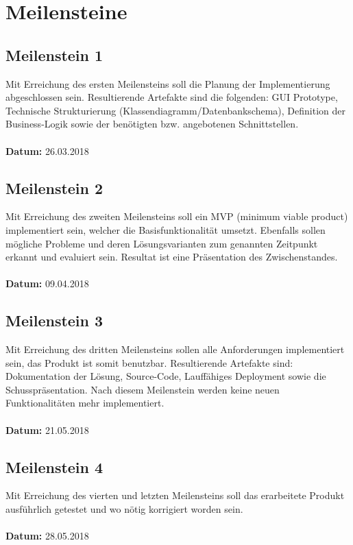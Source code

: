 \chapter{Meilensteine}
\vspace{0.5cm}

\section{Meilenstein 1}
Mit Erreichung des ersten Meilensteins soll die Planung der Implementierung abgeschlossen sein. Resultierende Artefakte sind die folgenden: GUI Prototype, Technische Strukturierung (Klassendiagramm/Datenbankschema), Definition der Business-Logik sowie der benötigten bzw. angebotenen Schnittstellen.\\ \\
\textbf{Datum:} 26.03.2018

\section{Meilenstein 2}
Mit Erreichung des zweiten Meilensteins soll ein MVP (minimum viable product) implementiert sein, welcher die Basisfunktionalität umsetzt. Ebenfalls sollen mögliche Probleme und deren Lösungsvarianten zum genannten Zeitpunkt erkannt und evaluiert sein. Resultat ist eine Präsentation des Zwischenstandes. \\ \\
\textbf{Datum:} 09.04.2018

\section{Meilenstein 3}
Mit Erreichung des dritten Meilensteins sollen alle Anforderungen implementiert sein, das Produkt ist somit benutzbar. Resultierende Artefakte sind: Dokumentation der Lösung, Source-Code, Lauffähiges Deployment sowie die Schusspräsentation. Nach diesem Meilenstein werden keine neuen Funktionalitäten mehr implementiert.\\ \\
\textbf{Datum:} 21.05.2018

\section{Meilenstein 4}
Mit Erreichung des vierten und letzten Meilensteins soll das erarbeitete Produkt ausführlich getestet und wo nötig korrigiert worden sein.\\ \\
\textbf{Datum:} 28.05.2018